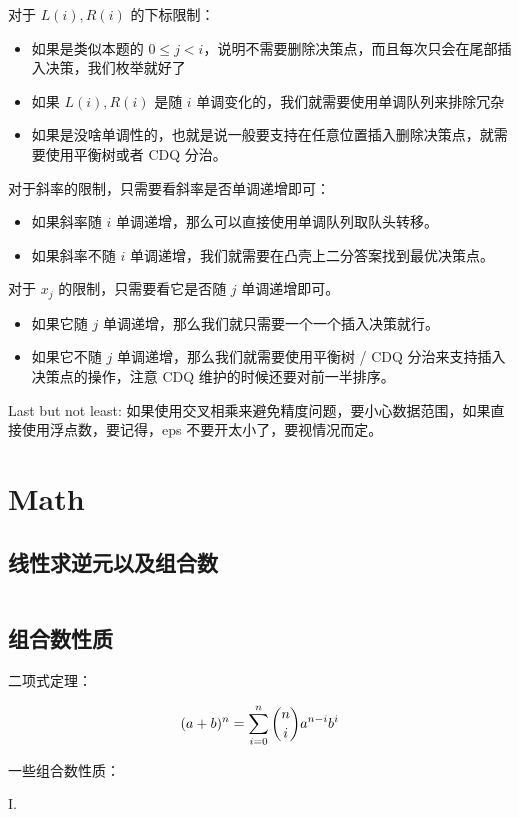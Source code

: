 \documentclass[titlepage, a4paper]{article}
\begin{document}
\begin{multicols}{2}
\begin{spacing}{0.6}
			 		对于 $L(i), R(i)$ 的下标限制：
			 		\begin{itemize}
			 			\item 如果是类似本题的 $0 \le j < i$，说明不需要删除决策点，而且每次只会在尾部插入决策，我们枚举就好了
			 			\item 如果 $L(i), R(i)$ 是随 $i$ 单调变化的，我们就需要使用单调队列来排除冗杂
			 			\item 如果是没啥单调性的，也就是说一般要支持在任意位置插入删除决策点，就需要使用平衡树或者 CDQ 分治。
			 		\end{itemize}
			 		对于斜率的限制，只需要看斜率是否单调递增即可：
			 		\begin{itemize}
			 			\item 如果斜率随 $i$ 单调递增，那么可以直接使用单调队列取队头转移。
			 			\item 如果斜率不随 $i$ 单调递增，我们就需要在凸壳上二分答案找到最优决策点。
			 		\end{itemize}
			 		对于 $x_j$ 的限制，只需要看它是否随 $j$ 单调递增即可。
			 		\begin{itemize}
			 			\item 如果它随 $j$ 单调递增，那么我们就只需要一个一个插入决策就行。
			 			\item 如果它不随 $j$ 单调递增，那么我们就需要使用平衡树 / CDQ 分治来支持插入决策点的操作，注意 CDQ 维护的时候还要对前一半排序。
			 		\end{itemize}
			 		
			 		Last but not least: 如果使用交叉相乘来避免精度问题，要小心数据范围，如果直接使用浮点数，要记得，eps 不要开太小了，要视情况而定。
			 		
			 \section{Math}
			 	\subsection{线性求逆元以及组合数}
			 		\inputminted{cpp}{src/Math/Comb_inv.cpp}
			 	\subsection{组合数性质}
			 		二项式定理：
			 	
				 	$$
				 	(a + b)^n = \sum\limits_{i = 0}^{n}\dbinom{n}{i}a^{n - i}b^{i}
				 	$$
				 	
				 	一些组合数性质：
				 	
				 	I. 
				 	

\end{spacing}
\end{multicols}
\end{document}
